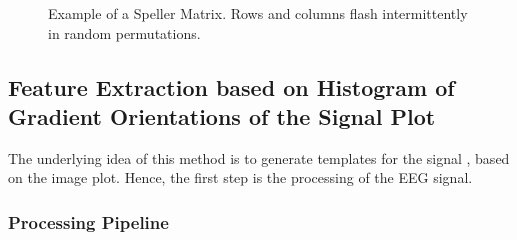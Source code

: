 \documentclass[entropy,article,submit,moreauthors,pdftex,10pt,a4paper]{mdpi}
\begin{document}
\begin{figure}[H]
\centering
{}
\caption{Example of a Speller Matrix.  Rows and columns flash intermittently in random permutations.}
\label{fig:p300matrix}
\end{figure}

\subsection{Feature Extraction based on Histogram of Gradient Orientations of the Signal Plot} \label{Feature}

The underlying idea of this method is to generate templates for the signal \citep{Ramele2016}, based on the image plot.  Hence, the first step is the processing of the EEG signal.

\subsubsection{Processing Pipeline} \label{Pipeline}
\end{document}
